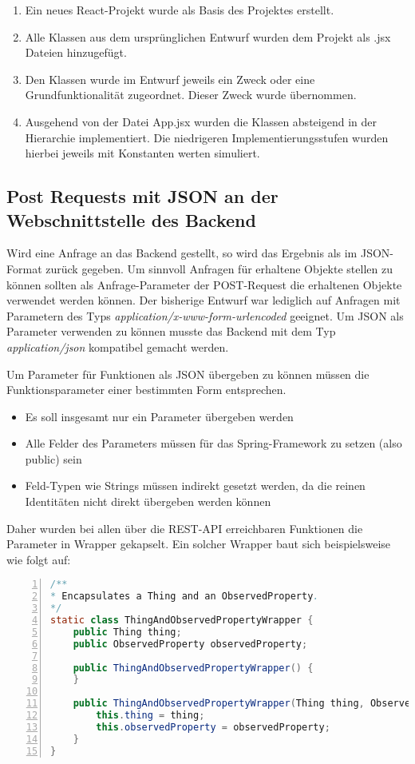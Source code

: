 \begin{enumerate}
    \item Ein neues React-Projekt wurde als Basis des Projektes erstellt.
    \item Alle Klassen aus dem ursprünglichen Entwurf wurden dem Projekt als .jsx Dateien hinzugefügt.
    \item Den Klassen wurde im Entwurf jeweils ein Zweck oder eine Grundfunktionalität zugeordnet. Dieser Zweck wurde übernommen.
    \item Ausgehend von der Datei App.jsx wurden die Klassen absteigend in der Hierarchie implementiert. Die niedrigeren Implementierungsstufen wurden hierbei jeweils mit Konstanten werten simuliert.
\end{enumerate}

\subsection{Post Requests mit JSON an der Webschnittstelle des Backend}
Wird eine Anfrage an das Backend gestellt, so wird das Ergebnis als im \gls{JSON}-Format zurück gegeben.
Um sinnvoll Anfragen für erhaltene Objekte stellen zu können sollten als Anfrage-Parameter der POST-Request die erhaltenen Objekte verwendet werden können.
Der bisherige Entwurf war lediglich auf Anfragen mit Parametern des Typs \textit{application/x-www-form-urlencoded} geeignet.
Um JSON als Parameter verwenden zu können musste das Backend mit dem Typ \textit{application/json} kompatibel gemacht werden.

Um Parameter für Funktionen als JSON übergeben zu können müssen die Funktionsparameter einer bestimmten Form entsprechen.
\begin{itemize}[noitemsep]
    \item Es soll insgesamt nur ein Parameter übergeben werden
    \item Alle Felder des Parameters müssen für das Spring-Framework zu setzen (also public) sein
    \item Feld-Typen wie Strings müssen indirekt gesetzt werden, da die reinen Identitäten nicht direkt übergeben werden können
\end{itemize}
Daher wurden bei allen über die REST-API erreichbaren Funktionen die Parameter in Wrapper gekapselt.
Ein solcher Wrapper baut sich beispielsweise wie folgt auf:
\begin{lstlisting}[language=java,
    basicstyle=\normalfont\ttfamily,
    numbers=left,
    numberstyle=\scriptsize,
    stepnumber=1,
    numbersep=8pt,
    showstringspaces=false,
    breaklines=true,
    frame=lines,
    backgroundcolor=\color{background}]
/**
* Encapsulates a Thing and an ObservedProperty.
*/
static class ThingAndObservedPropertyWrapper {
    public Thing thing;
    public ObservedProperty observedProperty;

    public ThingAndObservedPropertyWrapper() {
    }

    public ThingAndObservedPropertyWrapper(Thing thing, ObservedProperty observedProperty) {
        this.thing = thing;
        this.observedProperty = observedProperty;
    }
}
\end{lstlisting}

